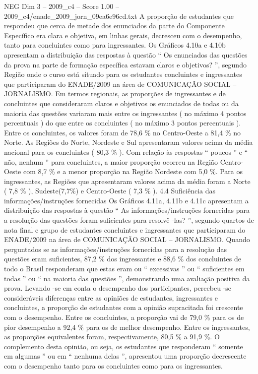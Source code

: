 \begin{textsample}{NEG Dim 3 – 2009\_c4 – Score 1.00 – 2009\_c4/enade\_2009\_jorn\_09ea6e96cd.txt}
A proporção de estudantes que respondeu que cerca de metade dos enunciados da parte do Componente Específico era clara e objetiva, em linhas gerais, decresceu com o desempenho, tanto para concluintes como para ingressantes.
Os Gráficos 4.10a e 4.10b apresentam a distribuição das respostas à questão “ Os enunciados das questões da prova na parte de formação específica estavam claros e objetivos? ”, segundo Região onde o curso está situado para os estudantes concluintes e ingressantes que participaram do ENADE/2009 na área de COMUNICAÇÃO SOCIAL – JORNALISMO.
Em termos regionais, as proporções de ingressantes e de concluintes que consideraram claros e objetivos os enunciados de todas ou da maioria das questões variaram mais entre os ingressantes ( no máximo 4 pontos percentuais ) do que entre os concluintes ( no máximo 3 pontos percentuais ).
Entre os concluintes, os valores foram de 78,6 \% no Centro-Oeste a 81,4 \% no Norte.
As Regiões do Norte, Nordeste e Sul apresentaram valores acima da média nacional para os concluintes ( 80,3 \% ).
Com relação às respostas “ poucos ” e “ não, nenhum ” para concluintes, a maior proporção ocorreu na Região Centro-Oeste com 8,7 \% e a menor proporção na Região Nordeste com 5,0 \%.
Para os ingressantes, as Regiões que apresentaram valores acima da média foram a Norte ( 7,8 \% ), Sudeste(7,7\%) e Centro-Oeste ( 7,3 \% ). 4.4 Suficiência das informações/instruções fornecidas Os Gráficos 4.11a, 4.11b e 4.11c apresentam a distribuição das respostas à questão “ As informações/instruções fornecidas para a resolução das questões foram suficientes para resolvê -las? ”, segundo quartos de nota final e grupo de estudantes concluintes e ingressantes que participaram do ENADE/2009 na área de COMUNICAÇÃO SOCIAL – JORNALISMO.
Quando perguntados se as informações/instruções fornecidas para a resolução das questões eram suficientes, 87,2 \% dos ingressantes e 88,6 \% dos concluintes de todo o Brasil responderam que estas eram ou “ excessivas ” ou “ suficientes em todas ” ou “ na maioria das questões ”, demonstrando uma avaliação positiva da prova.
Levando -se em conta o desempenho dos participantes, percebeu -se consideráveis diferenças entre as opiniões de estudantes, ingressantes e concluintes, a proporção de estudantes com a opinião supracitada foi crescente com o desempenho.
Entre os concluintes, a proporção vai de 79,0 \% para os de pior desempenho a 92,4 \% para os de melhor desempenho.
Entre os ingressantes, as proporções equivalentes foram, respectivamente, 80,5 \% a 91,9 \%.
O complemento desta opinião, ou seja, os estudantes que responderam “ somente em algumas ” ou em “ nenhuma delas ”, apresentou uma proporção decrescente com o desempenho tanto para os concluintes como para os ingressantes.

\end{textsample}
